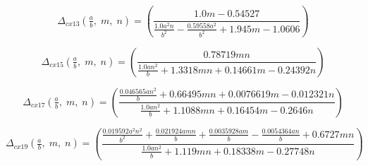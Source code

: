 \documentclass[11pt]{article}
\begin{document}
\begin{equation}
\label{eqd:cx13}
\Delta_{cx13}\!\left(\tfrac{a}{b},\; m,\; n\right) = \left(\frac{1.0 m - 0.54527}{\frac{1.0 a^{2} n}{b^{2}} - \frac{0.59558 a^{2}}{b^{2}} + 1.945 m - 1.0606}\right)
\end{equation}

\begin{equation}
\label{eqd:cx15}
\Delta_{cx15}\!\left(\tfrac{a}{b},\; m,\; n\right) = \left(\frac{0.78719 m n}{\frac{1.0 a n^{2}}{b} + 1.3318 m n + 0.14661 m - 0.24392 n}\right)
\end{equation}

\begin{equation}
\label{eqd:cx17}
\Delta_{cx17}\!\left(\tfrac{a}{b},\; m,\; n\right) = \left(\frac{\frac{0.046565 a n^{2}}{b} + 0.66495 m n + 0.0076619 m - 0.012321 n}{\frac{1.0 a n^{2}}{b} + 1.1088 m n + 0.16454 m - 0.2646 n}\right)
\end{equation}

\begin{equation}
\label{eqd:cx19}
\Delta_{cx19}\!\left(\tfrac{a}{b},\; m,\; n\right) = \left(\frac{\frac{0.019592 a^{2} n^{2}}{b^{2}} + \frac{0.021924 a m n}{b} + \frac{0.0035928 a m}{b} - \frac{0.0054364 a n}{b} + 0.6727 m n}{\frac{1.0 a n^{2}}{b} + 1.119 m n + 0.18338 m - 0.27748 n}\right)
\end{equation}
\end{document}
